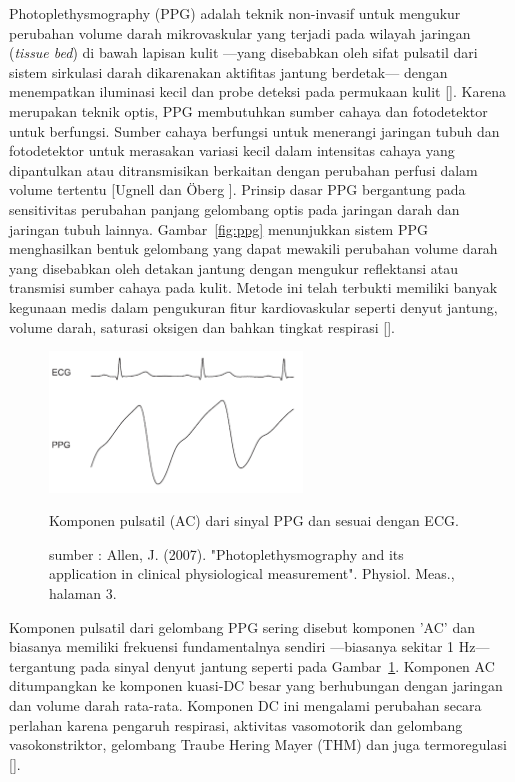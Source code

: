 Photoplethysmography (PPG) adalah teknik non-invasif untuk mengukur perubahan volume darah mikrovaskular yang terjadi pada wilayah jaringan (\textit{tissue bed}) di bawah lapisan kulit ---yang disebabkan oleh sifat pulsatil dari sistem sirkulasi darah dikarenakan aktifitas jantung berdetak--- dengan menempatkan iluminasi kecil dan probe deteksi pada permukaan kulit [\citet{Allen2007,Kamal1989}]. Karena merupakan teknik optis, PPG membutuhkan sumber cahaya dan fotodetektor untuk berfungsi. Sumber cahaya berfungsi untuk menerangi jaringan tubuh dan fotodetektor untuk merasakan variasi  kecil dalam intensitas cahaya yang dipantulkan atau ditransmisikan berkaitan dengan perubahan perfusi dalam volume tertentu [Ugnell dan Öberg \citep{ugnell1995}]. Prinsip dasar PPG bergantung pada sensitivitas perubahan panjang gelombang optis pada jaringan darah dan jaringan tubuh lainnya. Gambar~\ref{fig:ppg} menunjukkan sistem PPG menghasilkan bentuk gelombang yang dapat mewakili perubahan volume darah yang disebabkan oleh detakan jantung dengan mengukur reflektansi atau transmisi sumber cahaya pada kulit. Metode ini telah terbukti memiliki banyak kegunaan medis dalam pengukuran fitur kardiovaskular seperti denyut jantung, volume darah, saturasi oksigen dan bahkan tingkat respirasi [\citet{Allen2007,Charlton2016}].

\begin{figure}[ht]
\centering
 \includegraphics[width=0.6\textwidth]{ecg_and_ppg}
 \caption{Komponen pulsatil (AC) dari sinyal PPG dan sesuai dengan ECG.}
  \caption*{sumber : Allen, J. (2007). "Photoplethysmography and its application in clinical physiological measurement". Physiol. Meas., halaman 3.}
 \label{fig:ecg_and_ppg}   
\end{figure}

Komponen pulsatil dari gelombang PPG sering disebut komponen 'AC' dan biasanya memiliki frekuensi fundamentalnya sendiri ---biasanya sekitar 1 Hz--- tergantung pada sinyal denyut jantung seperti pada Gambar~\ref{fig:ecg_and_ppg}. Komponen AC ditumpangkan ke komponen kuasi-DC besar yang berhubungan dengan jaringan dan volume darah rata-rata. Komponen DC ini mengalami perubahan secara perlahan karena pengaruh respirasi, aktivitas vasomotorik dan gelombang vasokonstriktor, gelombang Traube Hering Mayer (THM) dan juga termoregulasi [\citet{Allen2007}].



